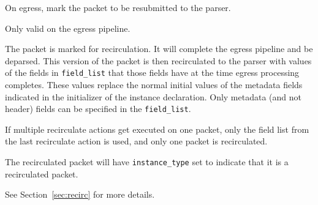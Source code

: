 \documentclass[12pt]{article}
\begin{document}

{ %
On egress, mark the packet to be resubmitted to the parser.
}
{ %
}
{ %
Only valid on the egress pipeline.

The packet is marked for recirculation. It will complete the egress pipeline 
and be deparsed.  This version of the packet is then recirculated to the parser 
with values of the fields in \texttt{field_list} that those fields
have at the time egress processing completes.
These values replace the normal initial values of the metadata fields indicated 
in the initializer of the instance declaration. Only metadata (and not header) fields can be specified in the \texttt{field_list}.

If multiple recirculate actions get executed on one packet, only the
field list from the last recirculate action is used, and only one
packet is recirculated.

The recirculated packet will have \texttt{instance_type} set to
indicate that it is a recirculated packet.

See Section~\ref{sec:recirc} for more details.

}

\end{document}
